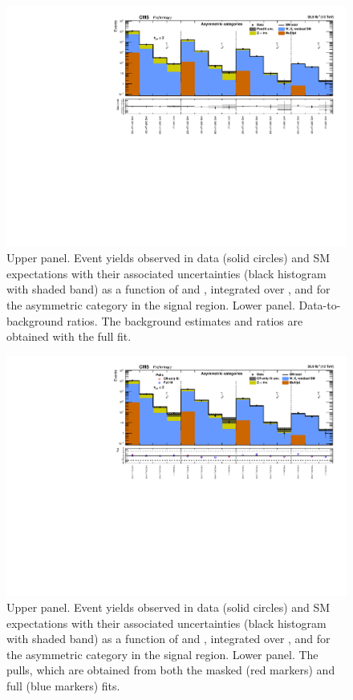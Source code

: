 \clearpage
\begin{figure}[h!]
  \centering
  \caption{Upper panel. Event yields observed in data (solid circles)
    and SM expectations with their associated uncertainties (black
    histogram with shaded band) as a function of \nb and \scalht,
    integrated over \mht, and for the asymmetric \njet category
    in the signal region. Lower panel. Data-to-background ratios. The
    background estimates and ratios are obtained with the full fit. }
  \label{fig:mr_asym_post}
  \includegraphics[width=1.\linewidth]{figures/results/36invfb_freeze/asym/summaryPlot_Asymmetric_fit_b}
\end{figure}

\clearpage
\begin{figure}[h!]
  \centering
  \caption{Upper panel. Event yields observed in data (solid circles)
    and SM expectations with their associated uncertainties (black
    histogram with shaded band) as a function of \nb and \scalht,
    integrated over \mht, and for the asymmetric \njet category
    in the signal region. Lower panel. The pulls, which are obtained
    from both the masked (red markers) and full (blue markers) fits. }
  \label{fig:mr_asym_pulls}
  \includegraphics[width=1.\linewidth]{figures/results/36invfb_freeze/asym/summaryPlot_Asymmetric_prefit_overlay_fit_b}
\end{figure}

